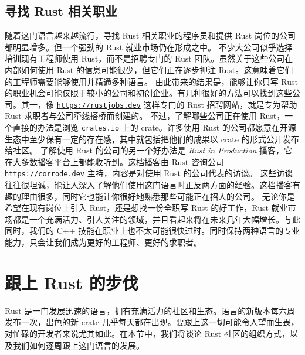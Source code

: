 \subsection{寻找 Rust 相关职业}
\label{idx:idx_852b9801}
随着这门语言越来越流行，寻找 Rust 相关职业的程序员和提供 Rust 岗位的公司都明显增多。但一个强劲的 Rust 就业市场仍在形成之中。
不少大公司似乎选择培训现有工程师使用 Rust，而不是招聘专门的 Rust 团队。虽然关于这些公司在内部如何使用 Rust 的信息可能很少，但它们正在逐步押注 Rust。这意味着它们的工程师需要能够使用并精通多种语言。
由此带来的结果是，能够让你只写 Rust 的职业机会可能仅限于较小的公司和初创企业。有几种很好的方法可以找到这些公司。其一，像 \href{https://rustjobs.dev}{\texttt{https:/\allowbreak{}/\allowbreak{}rustjobs.\allowbreak{}dev}} 这样专门的 Rust 招聘网站，就是专为帮助 Rust 求职者与公司牵线搭桥而创建的。
不过，了解哪些公司正在使用 Rust，一个直接的办法是浏览
\texttt{crates.io} 上的 crate。许多使用 Rust 的公司都愿意在开源
生态中至少保有一定的存在感，其中就包括把他们的成果以 crate 的形式公开发布给社区。
了解使用 Rust 的公司的另一个好办法是 \emph{Rust in Production} 播客，它在大多数播客平台上都能收听到。这档播客由 Rust 咨询公司
\href{https://corrode.dev}{\texttt{https:/\allowbreak{}/\allowbreak{}corrode.\allowbreak{}dev}} 主持，内容是对使用 Rust 的公司代表的访谈。
这些访谈往往很坦诚，能让人深入了解他们使用这门语言时正反两方面的经验。这档播客有趣的理由很多，同时它也能让你很好地熟悉那些可能正在招人的公司。
\label{idx:idx_f1ff0f79}
无论你是希望在现有岗位上引入 Rust，还是想找一份全职写 Rust 的好工作，Rust 就业市场都是一个充满活力、引人关注的领域，并且看起来将在未来几年大幅增长。与此同时，我们的 C++ 技能在职业上也不太可能很快过时。同时保持两种语言的专业能力，只会让我们成为更好的工程师、更好的求职者。
\section{跟上 Rust 的步伐}
Rust 是一门发展迅速的语言，拥有充满活力的社区和生态。语言的新版本每六周发布一次，出色的新 crate 几乎每天都在出现。要跟上这一切可能令人望而生畏，对忙碌的开发者来说尤其如此。在本节中，我们将谈论 Rust 社区的组织方式，以及我们如何逐周跟上这门语言的发展。

